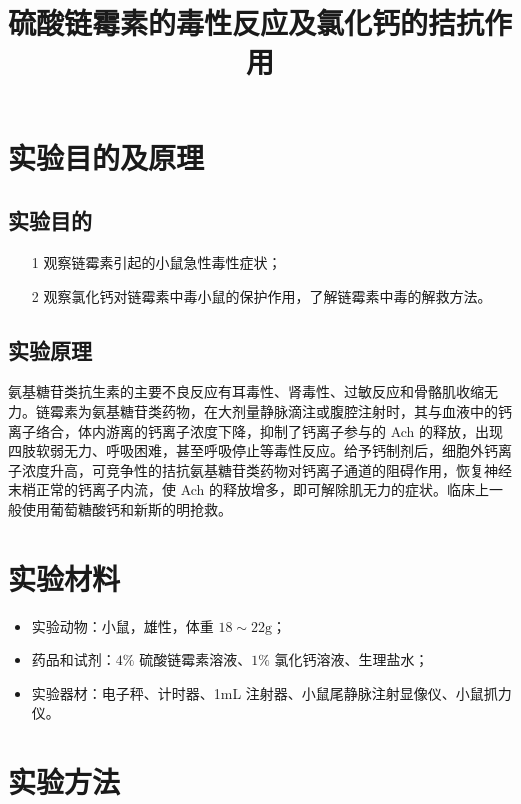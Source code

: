\documentclass[UTF8]{ctexart}
\title{硫酸链霉素的毒性反应及氯化钙的拮抗作用}
\author{}
\begin{document}
\date{}
\maketitle

\section{实验目的及原理}

\subsection{实验目的}

\begin{itemize}
    \item [1] 观察链霉素引起的小鼠急性毒性症状；
    \item [2] 观察氯化钙对链霉素中毒小鼠的保护作用，了解链霉素中毒的解救方法。
\end{itemize}

\subsection{实验原理}

氨基糖苷类抗生素的主要不良反应有耳毒性、肾毒性、过敏反应和骨骼肌收缩无力。链霉素为氨基糖苷类药物，在大剂量静脉滴注或腹腔注射时，其与血液中的钙离子络合，体内游离的钙离子浓度下降，抑制了钙离子参与的 Ach 的释放，出现四肢软弱无力、呼吸困难，甚至呼吸停止等毒性反应。给予钙制剂后，细胞外钙离子浓度升高，可竞争性的拮抗氨基糖苷类药物对钙离子通道的阻碍作用，恢复神经末梢正常的钙离子内流，使 Ach 的释放增多，即可解除肌无力的症状。临床上一般使用葡萄糖酸钙和新斯的明抢救。

\section{实验材料}

\begin{itemize}
    \item 实验动物：小鼠，雄性，体重 $18\sim 22\text{g}$；
    \item 药品和试剂：$4\%$ 硫酸链霉素溶液、$1\%$ 氯化钙溶液、生理盐水；
    \item 实验器材：电子秤、计时器、1mL 注射器、小鼠尾静脉注射显像仪、小鼠抓力仪。
\end{itemize}

\section{实验方法}
\end{document}
